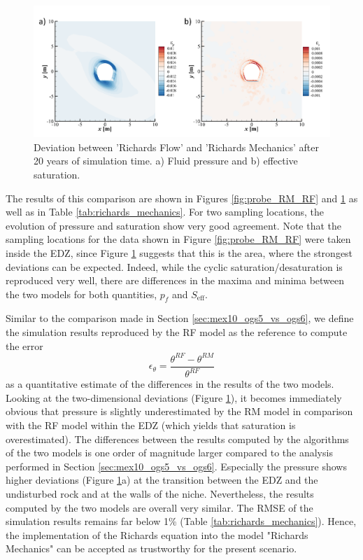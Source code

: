 \begin{figure}[t]
\includegraphics[width=\textwidth, trim=0.5cm  0.0cm 0 0.0cm, clip]{./figures/MEX10_cf_RF_RM_2d.png}
\caption{Deviation between 'Richards Flow' and 'Richards Mechanics' after 20 years of simulation time. a) Fluid pressure and b) effective saturation.}
\label{fig:richards_mechancis}
\end{figure}

The results of this comparison are shown in Figures \ref{fig:probe_RM_RF} and \ref{fig:richards_mechancis} as well as in Table \ref{tab:richards_mechanics}. For two sampling locations, the evolution of pressure and saturation show very good agreement. Note that the sampling locations for the data shown in Figure \ref{fig:probe_RM_RF} were taken inside the EDZ, since Figure \ref{fig:richards_mechancis} suggests that this is the area, where the strongest deviations can be expected. Indeed, while the cyclic saturation/desaturation is reproduced very well, there are differences in the maxima and minima between the two models for both quantities, $p_f$ and $S_\text{eff}$.  

Similar to the comparison made in Section \ref{sec:mex10_ogs5_vs_ogs6}, we define the simulation results reproduced by the RF model as the reference to compute the error
%
\begin{equation}\label{eq:error_rm_rf}
\epsilon_\theta = \frac{\theta^{RF}-\theta^{RM}}{\theta^{RF}}
\end{equation}
% 
as a quantitative estimate of the differences in the results of the two models. Looking at the two-dimensional deviations (Figure \ref{fig:richards_mechancis}), it becomes immediately obvious that pressure is slightly underestimated by the RM model in comparison with the RF model within the EDZ (which yields that saturation is overestimated). The differences between the results computed by the algorithms of the two models is one order of magnitude larger compared to the analysis performed in Section \ref{sec:mex10_ogs5_vs_ogs6}. Especially the pressure shows higher deviations (Figure \ref{fig:richards_mechancis}a) at the transition between the EDZ and the undisturbed rock and at the walls of the niche. Nevertheless, the results computed by the two models are overall very similar. The RMSE of the simulation results remains far below 1\% (Table \ref{tab:richards_mechanics}). Hence, the implementation of the Richards equation into the model "Richards Mechanics" can be accepted as trustworthy for the present scenario. 

